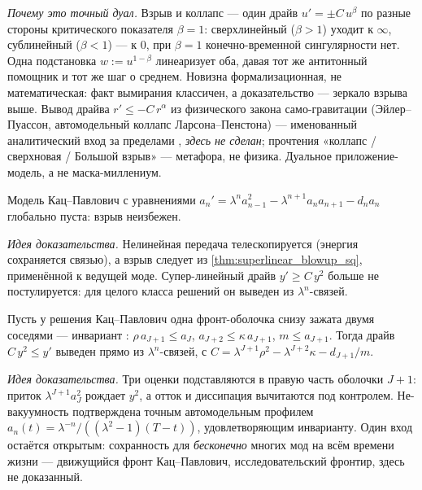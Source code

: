 \emph{Почему это точный дуал.} Взрыв и коллапс --- один драйв $u' = \pm C\,u^{\beta}$ по разные
стороны критического показателя $\beta=1$: сверхлинейный ($\beta>1$) уходит к $\infty$, сублинейный
($\beta<1$) --- к $0$, при $\beta=1$ конечно-временной сингулярности нет. Одна подстановка
$w := u^{1-\beta}$ линеаризует оба, давая тот же антитонный помощник и тот же шаг о среднем. Новизна
формализационная, не математическая: факт вымирания классичен, а доказательство --- зеркало взрыва
выше. Вывод драйва $r'\le -C\,r^{\alpha}$ из физического закона само-гравитации (Эйлер--Пуассон,
автомодельный коллапс Ларсона--Пенстона) --- именованный аналитический вход за пределами
, \emph{здесь не сделан}; прочтения «коллапс / сверхновая / Большой взрыв» --- метафора,
не физика. Дуальное приложение-модель, а не маска-миллениум.

\begin{theorem}\label{thm:dyadic_blowup}
Модель Кац--Павлович  с уравнениями
$a_n' = \lambda^n a_{n-1}^2 - \lambda^{n+1} a_n a_{n+1} - d_n a_n$ глобально пуста: взрыв неизбежен.
\green{}
\end{theorem}

\emph{Идея доказательства.} Нелинейная передача телескопируется (энергия сохраняется связью), а взрыв
следует из \cref{thm:superlinear_blowup_sq}, применённой к ведущей моде. Супер-линейный драйв
$y' \ge C\,y^2$ больше не постулируется: для целого класса решений он выведен из
$\lambda^n$-связей.

\begin{theorem}\label{thm:frontDrive_of_invariant}
Пусть у решения Кац--Павлович одна фронт-оболочка снизу зажата двумя соседями --- инвариант
: $\rho\, a_{J+1} \le a_J$, $a_{J+2} \le \kappa\, a_{J+1}$, $m \le a_{J+1}$.
Тогда драйв $C\,y^2 \le y'$ выведен прямо из $\lambda^n$-связей, с
$C = \lambda^{J+1}\rho^2 - \lambda^{J+2}\kappa - d_{J+1}/m$. \green{}
\end{theorem}

\emph{Идея доказательства.} Три оценки подставляются в правую часть оболочки $J+1$: приток
$\lambda^{J+1} a_J^2$ рождает $y^2$, а отток и диссипация вычитаются под контролем. Не-вакуумность
подтверждена точным автомодельным профилем $a_n(t) = \lambda^{-n}/((\lambda^2-1)(T-t))$,
удовлетворяющим инварианту. Один вход остаётся открытым: сохранность  для
\emph{бесконечно} многих мод на всём времени жизни --- движущийся фронт Кац--Павлович,
исследовательский фронтир, здесь не доказанный.

